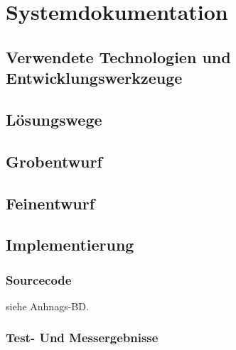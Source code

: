 \chapter{Systemdokumentation}

\section[Technologien]{Verwendete Technologien und Entwicklungswerkzeuge}





\section{Lösungswege}







\section{Grobentwurf}



\section{Feinentwurf}

\section{Implementierung}

\subsection{Sourcecode}

siehe Anhnags-BD.

\subsection{Test- Und Messergebnisse}
